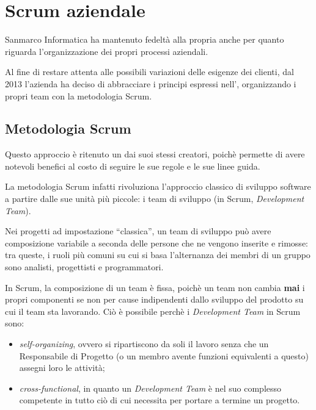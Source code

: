 \section{Scrum aziendale}

Sanmarco Informatica ha mantenuto fedeltà alla propria  anche
per quanto riguarda l'organizzazione dei propri processi aziendali.

Al fine di restare attenta alle possibili variazioni delle esigenze dei
clienti, dal 2013 l'azienda ha deciso di abbracciare i principi espressi
nell', organizzando i propri team con la metodologia
Scrum.

\subsection{Metodologia Scrum}

Questo approccio è ritenuto un  dai suoi stessi creatori,
poichè permette di avere notevoli benefici al costo di seguire le sue regole e
le sue linee guida.

La metodologia Scrum infatti rivoluziona l'approccio classico di sviluppo
software a partire dalle sue unità più piccole: i team di sviluppo (in Scrum,
\emph{Development Team}).

Nei progetti ad impostazione ``classica'', un team di sviluppo può avere
composizione variabile a seconda delle persone che ne vengono inserite e
rimosse: tra queste, i ruoli più comuni su cui si basa l'alternanza dei membri
di un gruppo sono analisti, progettisti e programmatori.

In Scrum, la composizione di un team è fissa, poichè un team non cambia
\textbf{mai} i propri componenti se non per cause indipendenti dallo sviluppo
del prodotto su cui il team sta lavorando. Ciò è possibile perchè i
\emph{Development Team} in Scrum sono:

\begin{itemize}
	\item \emph{self-organizing}, ovvero si ripartiscono da soli il lavoro senza
	che un Responsabile di Progetto (o un membro avente funzioni equivalenti a
	questo) assegni loro le attività;
	\item \emph{cross-functional}, in quanto un \emph{Development Team} è nel suo
	complesso competente in tutto ciò di cui necessita per portare a termine un
	progetto.
\end{itemize}

